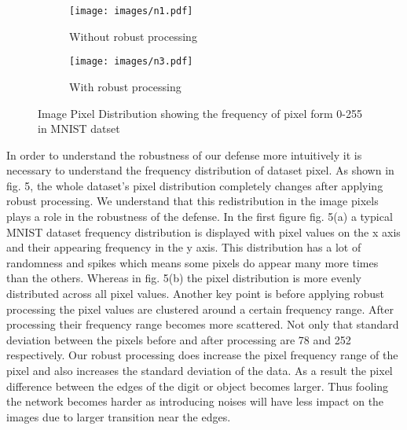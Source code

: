 \documentclass[conference]{IEEEtran}
\begin{document}
\begin{figure}[h]
  \begin{subfigure}[b]{0.4\textwidth}
    \texttt{[image: images/n1.pdf]}
    \caption{Without robust processing}
    \label{fig:1}
  \end{subfigure}
  \begin{subfigure}[b]{0.4\textwidth}
    \texttt{[image: images/n3.pdf]}
    \caption{With robust processing}
    \label{fig:2}
  \end{subfigure}
  \caption{Image Pixel Distribution showing the frequency of pixel form 0-255 in MNIST datset}
\end{figure}

In order to understand the robustness of our defense more intuitively it is necessary to understand the frequency distribution of dataset pixel. As shown in fig. 5, the whole dataset's pixel distribution completely changes after applying robust processing. We understand that this redistribution in the image pixels plays a role in the robustness of the defense. In the first figure fig. 5(a) a typical MNIST dataset frequency distribution is displayed with pixel values on the x axis and their appearing frequency in the y axis. This distribution has a lot of randomness and spikes which means some pixels do appear many more times than the others. Whereas in fig. 5(b) the pixel distribution is more evenly distributed across all pixel values. Another key point is before applying robust processing the pixel values are clustered around a certain frequency range. After processing their frequency range becomes more scattered. Not only that standard deviation between the pixels before and after processing are 78 and 252 respectively. Our robust processing does increase the pixel frequency range of the pixel and also increases the standard deviation of the data. As a result the pixel difference between the edges of the digit or object becomes larger. Thus fooling the network becomes harder as introducing noises will have less impact on the images due to larger transition near the edges.
\end{document}
